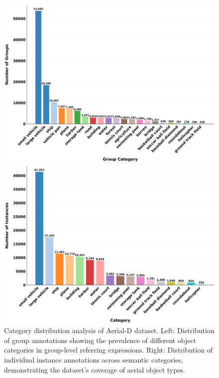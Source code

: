 \begin{figure}[t]
\centering
\begin{minipage}{0.48\textwidth}
\centering
\includegraphics[width=\textwidth]{./images/group_category_distribution.png}
\end{minipage}\hfill
\begin{minipage}{0.48\textwidth}
\centering
\includegraphics[width=\textwidth]{./images/instance_category_distribution.png}
\end{minipage}
\caption{Category distribution analysis of Aerial-D dataset. Left: Distribution of group annotations showing the prevalence of different object categories in group-level referring expressions. Right: Distribution of individual instance annotations across semantic categories, demonstrating the dataset's coverage of aerial object types.}
\label{fig:category_distributions}
\end{figure}

